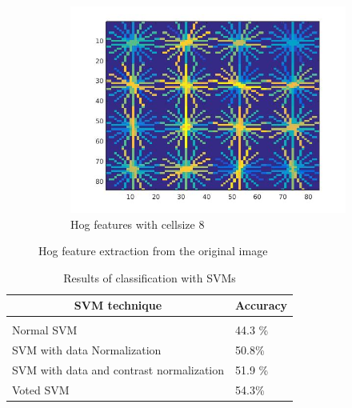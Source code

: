 \documentclass{article} %
\begin{document}
\begin{figure}
\begin{subfigure}{0.33\textwidth}
\includegraphics[scale=0.3]{images/hog_cellsize_8}
\caption{Hog features with cellsize 8}
\end{subfigure}
\caption{Hog feature extraction from the original image}
\end{figure}



\begin{table}[t]
    \begin{center}
        \begin{tabular}{ll}
        \multicolumn{1}{c}{\bf SVM technique}  &\multicolumn{1}{c}{\bf Accuracy}
        \\ \hline \\
        Normal SVM         & 44.3 \% \\
        SVM with data Normalization             & 50.8\% \\
        SVM with data and contrast normalization &51.9 \% \\
        Voted SVM	& 54.3\% \\
        \end{tabular}
    \end{center}
    \caption{Results of classification with SVMs}
    \label{tab:svm}
\end{table}
\end{document}
